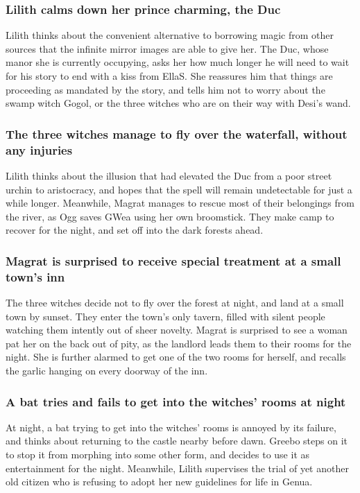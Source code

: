 \subsubsection{\Gls{Lilith} calms down her prince charming, the \Gls{Duc}}
\Gls{Lilith} thinks about the convenient alternative to borrowing magic from other sources that the
infinite mirror images are able to give her. The \Gls{Duc}, whose manor she is currently
occupying, asks her how much longer he will need to wait for his story to end with a kiss from
\Gls{EllaS}. She reassures him that things are proceeding as mandated by the story, and tells him
not to worry about the swamp witch \Gls{Gogol}, or the three witches who are on their way with
\Gls{Desi}'s wand.

\subsubsection{The three witches manage to fly over the waterfall, without any injuries}
\Gls{Lilith} thinks about the illusion that had elevated the \Gls{Duc} from a poor street urchin
to aristocracy, and hopes that the spell will remain undetectable for just a while longer.
Meanwhile, \Gls{Magrat} manages to rescue most of their belongings from the river, as \Gls{Ogg}
saves \Gls{GWea} using her own broomstick. They make camp to recover for the night, and set off
into the dark forests ahead.

\subsubsection{\Gls{Magrat} is surprised to receive special treatment at a small town's inn}
The three witches decide not to fly over the forest at night, and land at a small town by sunset.
They enter the town's only tavern, filled with silent people watching them intently out of sheer
novelty. \Gls{Magrat} is surprised to see a woman pat her on the back out of pity, as the landlord
leads them to their rooms for the night. She is further alarmed to get one of the two rooms for
herself, and recalls the garlic hanging on every doorway of the inn.

\subsubsection{A bat tries and fails to get into the witches' rooms at night}
At night, a bat trying to get into the witches' rooms is annoyed by its failure, and thinks about
returning to the castle nearby before dawn. \Gls{Greebo} steps on it to stop it from morphing into
some other form, and decides to use it as entertainment for the night. Meanwhile, \Gls{Lilith}
supervises the trial of yet another old citizen who is refusing to adopt her new guidelines for
life in Genua.

